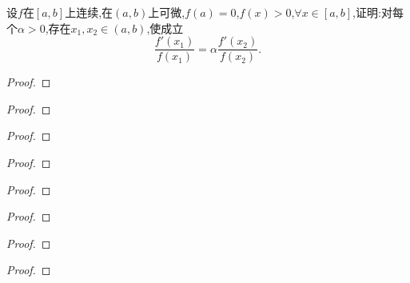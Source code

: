 \documentclass[lang=cn,newtx,10pt,scheme=chinese]{elegantbook}
\begin{document}
\begin{exercise}
    设\(f\)在\([a,b]\)上连续,在\((a,b)\)上可微,\(f(a)=0\),\(f(x)>0\),\(\forall x\in[a,b]\),证明:对每个\(\alpha>0\),存在\(x_1,x_2\in(a,b)\),使成立
    \[
    \frac{f'(x_1)}{f(x_1)}=\alpha\frac{f'(x_2)}{f(x_2)}.
    \]
\end{exercise}
\begin{proof}
    
\end{proof}

\begin{exercise}

\end{exercise}
\begin{proof}
    
\end{proof}

\begin{exercise}

\end{exercise}
\begin{proof}
    
\end{proof}

\begin{exercise}

\end{exercise}
\begin{proof}
    
\end{proof}

\begin{exercise}

\end{exercise}
\begin{proof}
    
\end{proof}

\begin{exercise}

\end{exercise}
\begin{proof}
    
\end{proof}

\begin{exercise}

\end{exercise}
\begin{proof}
    
\end{proof}

\begin{exercise}

\end{exercise}
\begin{proof}
    
\end{proof}
\end{document}
